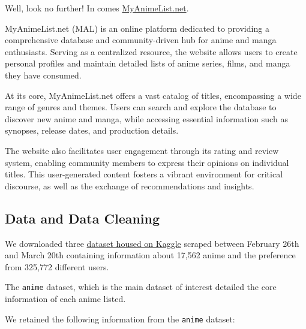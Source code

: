 \documentclass[
]{article}
\begin{document}
Well, look no further! In comes
\href{https://myanimelist.net/}{MyAnimeList.net}.

MyAnimeList.net (MAL) is an online platform dedicated to providing a
comprehensive database and community-driven hub for anime and manga
enthusiasts. Serving as a centralized resource, the website allows users
to create personal profiles and maintain detailed lists of anime series,
films, and manga they have consumed.

At its core, MyAnimeList.net offers a vast catalog of titles,
encompassing a wide range of genres and themes. Users can search and
explore the database to discover new anime and manga, while accessing
essential information such as synopses, release dates, and production
details.

The website also facilitates user engagement through its rating and
review system, enabling community members to express their opinions on
individual titles. This user-generated content fosters a vibrant
environment for critical discourse, as well as the exchange of
recommendations and insights.

\hypertarget{data-and-data-cleaning}{%
\subsection{Data and Data Cleaning}\label{data-and-data-cleaning}}

We downloaded three
\href{https://www.kaggle.com/datasets/hernan4444/anime-recommendation-database-2020?select=anime.csv}{dataset
housed on Kaggle} scraped between February 26th and March 20th
containing information about 17,562 anime and the preference from
325,772 different users.

The \texttt{anime} dataset, which is the main dataset of interest
detailed the core information of each anime listed.

We retained the following information from the \texttt{anime} dataset:
\end{document}
